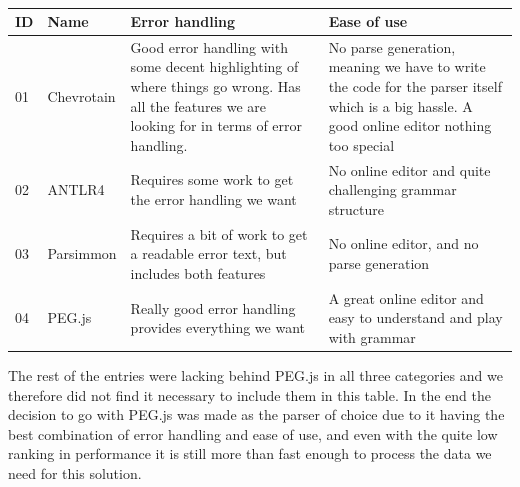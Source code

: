 
\begin{table}[H]
\begin{tabularx}{\textwidth}{|l|l|X|X|}
\hline
\rowcolor[HTML]{9B9B9B} 
ID & Name       & Error handling                                                                                                                                  & Ease of use                                                                                                                                  \\ \hline
01 & Chevrotain\cite{ChevrotainGithub} & Good error handling with some decent highlighting of where things go wrong. Has all the features we are looking for in terms of error handling. & No parse generation, meaning we have to write the code for the parser itself which is a big hassle. A good online editor nothing too special \\ \hline
02 & ANTLR4\cite{ANTLRGithub}     & Requires some work to get the error handling we want                                                                                            & No online editor and quite challenging grammar structure                                                                                     \\ \hline
03 & Parsimmon\cite{ParsimmonGithub}  & Requires a bit of work to get a readable error text, but includes both features                                                                 & No online editor, and no parse generation                                                                                                    \\ \hline
04 & PEG.js\cite{PEGJSGithub}     & Really good error handling provides everything we want                                                                                          & A great online editor and easy to understand and play with grammar                                                                           \\ \hline
\end{tabularx}
\caption{}
\label{}
\end{table}

The rest of the entries were lacking behind PEG.js in all three categories and we therefore did not find it necessary to include them in this table. In the end the decision to go with PEG.js was made as the parser of choice due to it having the best combination of error handling and ease of use, and even with the quite low ranking in performance it is still more than fast enough to process the data we need for this solution. 



